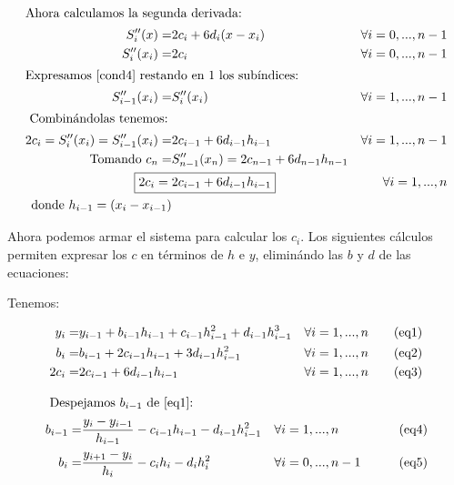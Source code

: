 \begin{align*}
\intertext{Ahora calculamos la segunda derivada: }
S''_i(x) = & 2c_i + 6d_i(x-x_i)   & \forall i=0, ..., n-1 \\
S''_i(x_i) = & 2c_i & \forall i=0, ..., n-1 \\
\intertext{Expresamos \eqref{cond4} restando en 1 los subíndices: } 
S''_{i-1}(x_i) = & S''_i(x_i) 	 & \forall i= 1, ..., n-1 \\
\intertext{ Combinándolas tenemos: } 
2c_i =  S''_i(x_i) = S''_{i-1}(x_i) = & 2c_{i-1} + 6d_{i-1}h_{i-1}	 & \forall i= 1, ..., n-1 \\
\text{Tomando } c_n = & S''_{n-1}(x_n) = 2c_{n-1} + 6d_{n-1}h_{n-1} \\
\Aboxed{2c_i = & 2c_{i-1} + 6d_{i-1}h_{i-1}} & \forall i= 1, ..., n \\
\text{donde } h_{i-1} = (x_i-x_{i-1}) \\
\end{align*}


\par Ahora podemos armar el sistema para calcular los $c_i$. Los siguientes cálculos permiten expresar los $c$ en términos de $h$ e $y$, eliminándo las $b$ y $d$ de las ecuaciones:

\par Tenemos:

\begin{align}
\setcounter{equation}{0}
y_i =& y_{i-1} + b_{i-1}h_{i-1} + c_{i-1}h_{i-1}^2 +  d_{i-1}h_{i-1}^3  & \forall i= 1, ..., n \tag{eq1} \label{eq1}\\
b_i =& b_{i-1} + 2c_{i-1}h_{i-1} + 3d_{i-1}h_{i-1}^2 & \forall i= 1, ..., n  \tag{eq2} \label{eq2}\\
2c_i =& 2c_{i-1} + 6d_{i-1}h_{i-1}  & \forall i= 1, ..., n \tag{eq3} \label{eq3}
\end{align}


\begin{align*}
\intertext{ Despejamos $b_{i-1}$ de \eqref{eq1}: } 
b_{i-1} = &  \frac{y_i-y_{i-1}}{h_{i-1}} - c_{i-1}h_{i-1} - d_{i-1}h_{i-1}^2  & & \forall i= 1, ..., n & \tag{eq4} \label{eq4} \\
b_{i} = &  \frac{y_{i+1}-y_{i}}{h_{i}} - c_{i}h_{i} - d_{i}h_{i}^2  & & \forall i= 0, ..., n-1 & \tag{eq5} \label{eq5} \\
\end{align*}

